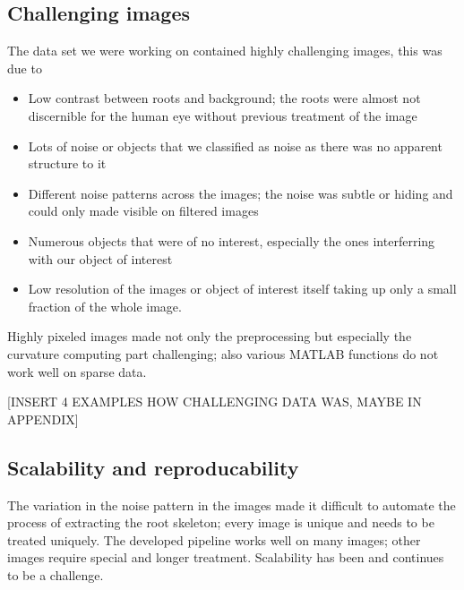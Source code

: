 

\subsection{Challenging images}

The data set we were working on contained highly challenging images, this was due to
\begin{itemize}
	\item Low contrast between roots and background; the roots were almost not discernible for the human eye without previous treatment of the image
	\item Lots of noise or objects that we classified as noise as there was no apparent structure to it
	\item Different noise patterns across the images; the noise was subtle or hiding and could only made visible on filtered images
	\item Numerous objects that were of no interest, especially the ones interferring with our object of interest
	\item Low resolution of the images or object of interest itself taking up only a small fraction of the whole image. 
\end{itemize}
Highly pixeled images made not only the preprocessing but especially the curvature computing part challenging; also various MATLAB functions do not work well on sparse data.

[INSERT 4 EXAMPLES HOW CHALLENGING DATA WAS, MAYBE IN APPENDIX]



\subsection{Scalability and reproducability}

The variation in the noise pattern in the images made it difficult to automate the process of extracting the root skeleton; every image is unique and needs to be treated uniquely. The developed pipeline works well on many images; other images require special and longer treatment. Scalability has been and continues to be a challenge.

